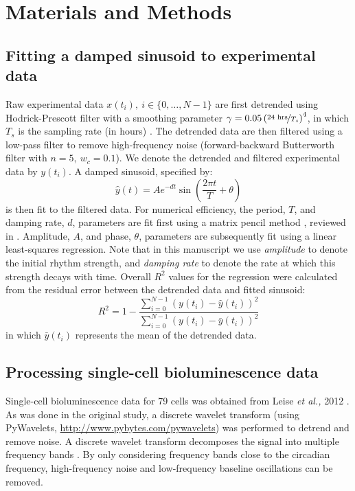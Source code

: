\documentclass[11pt, letterpaper]{article}
\begin{document}
\section*{Materials and Methods}

\subsection*{Fitting a damped sinusoid to experimental data}
Raw experimental data $x(t_i), \  i \in \{0, \dots, N-1\}$ are first detrended using Hodrick-Prescott filter with a smoothing parameter $\gamma = 0.05\left(\nicefrac{24 \text{ hrs}}{T_s}\right)^4$, in which $T_s$ is the sampling rate (in hours) \cite{Ravn2002}.
The detrended data are then filtered using a low-pass filter to remove high-frequency noise (forward-backward Butterworth filter with $n = 5,\ w_c = 0.1$).
We denote the detrended and filtered experimental data by $y(t_i)$.
A damped sinusoid, specified by:
\[
  \hat{y}(t) = A e^{-d t} \sin\left(\frac{2\pi t}{T} + \theta\right)
\]
is then fit to the filtered data.
For numerical efficiency, the period, $T$, and damping rate, $d$, parameters are fit first using a matrix pencil method \cite{Hua1990}, reviewed in \cite{Zielinski2011}.
Amplitude, $A$, and phase, $\theta$, parameters are subsequently fit using a linear least-squares regression.
Note that in this manuscript we use {\itshape amplitude} to denote the initial rhythm strength, and {\itshape damping rate} to denote the rate at which this strength decays with time.
Overall $R^2$ values for the regression were calculated from the residual error between the detrended data and fitted sinusoid:
\[
  R^2 = 1 - \frac{\sum_{i = 0}^{N-1} (y(t_i) - \hat{y}(t_i))^2}{\sum_{i = 0}^{N-1} (y(t_i) - \bar{y}(t_i))^2}
\]
in which $\bar{y}(t_i)$ represents the mean of the detrended data.


\subsection*{Processing single-cell bioluminescence data}

Single-cell bioluminescence data for 79 cells was obtained from Leise {\itshape et al.,} 2012 \cite{Leise2012}.
As was done in the original study, a discrete wavelet transform (using PyWavelets, \url{http://www.pybytes.com/pywavelets}) was performed to detrend and remove noise.
A discrete wavelet transform decomposes the signal into multiple frequency bands \cite{Leise2011}. 
By only considering frequency bands close to the circadian frequency, high-frequency noise and low-frequency baseline oscillations can be removed.
\end{document}
